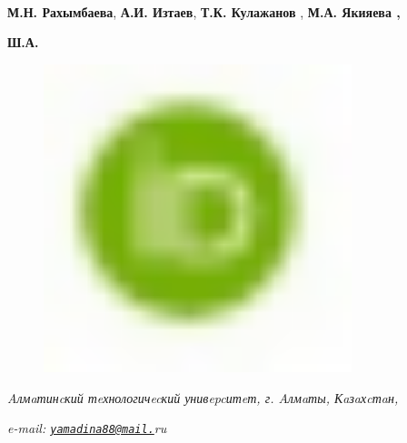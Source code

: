 {{\bfseries М.Н. Рахымбаева}, {\bfseries А.И. Изтаев}, {\bfseries Т.К. Кулажанов}
, {\bfseries М.А. Якияева\textsuperscript{\envelope } ,}

{\bfseries Ш.А.
\begin{figure}[H]
	\centering
	\includegraphics[width=0.8\textwidth]{media/pish2/image17}
	\caption*{}
\end{figure}


\emph{Aлмaтинcкий тeхнологичecкий унивepcитeт, г. Aлмaты, Кaзaхcтaн,}

\emph{e-mail:
\href{mailto:yamadina88@mail.}{\nolinkurl{yamadina88@mail.}}ru}

}}
